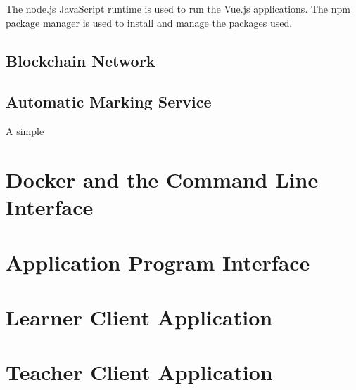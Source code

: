 The node.js JavaScript runtime is used to run the Vue.js applications. The npm package manager 
is used to install and manage the packages used.

\subsection{Blockchain Network}



\subsection{Automatic Marking Service}

A simple 

\section{Docker and the Command Line Interface}

\section{Application Program Interface}

\section{Learner Client Application}

\section{Teacher Client Application}

